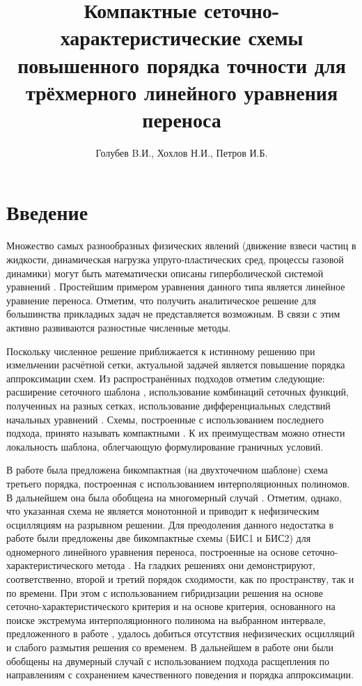 \documentclass[11pt]{article}
\title{Компактные сеточно-характеристические схемы повышенного порядка точности для трёхмерного линейного уравнения переноса}
\date{}
\author{Голубев B.И., Хохлов Н.И., Петров И.Б.}
\begin{document}
\maketitle

\section{Введение}

Множество самых разнообразных физических явлений (движение взвеси частиц в жидкости, динамическая нагрузка упруго-пластических сред, процессы газовой динамики) могут быть математически описаны гиперболической системой уравнений \cite{Kholodov2008}.
Простейшим примером уравнения данного типа является линейное уравнение переноса.
Отметим, что получить аналитическое решение для большинства прикладных задач не представляется возможным.
В связи с этим активно развиваются разностные численные методы.

Поскольку численное решение приближается к истинному решению при измельчении расчётной сетки, актуальной задачей является повышение порядка аппроксимации схем.
Из распространённых подходов отметим следующие: расширение сеточного шаблона \cite{Rusanov1961}, использование комбинаций сеточных функций, полученных на разных сетках,
использование дифференциальных следствий начальных уравнений \cite{Khol2006}.
Схемы, построенные с использованием последнего подхода, принято называть компактными \cite{Tolstih1990}.
К их преимуществам можно отнести локальность шаблона, облегчающую формулирование граничных условий.

В работе \cite{Yabe1991} была предложена бикомпактная (на двухточечном шаблоне) схема третьего порядка, построенная с использованием интерполяционных полиномов.
В дальнейшем она была обобщена на многомерный случай \cite{Yabe2004}.
Отметим, однако, что указанная схема не является монотонной и приводит к нефизическим осцилляциям на разрывном решении.
Для преодоления данного недостатка в работе \cite{Khokhlov1D2014} были предложены две бикомпактные схемы (БИС1 и БИС2) для одномерного
линейного уравнения переноса, построенные на основе сеточно-характеристического метода \cite{Magometov-Kholodov-1969}.
На гладких решениях они демонстрируют, соответственно, второй и третий порядок сходимости, как по пространству, так и по времени.
При этом с использованием гибридизации решения \cite{petrov1984} на основе сеточно-характеристического критерия \cite{van1979} и на основе критерия,
основанного на поиске экстремума интерполяционного полинома на выбранном интервале, предложенного в работе \cite{Khokhlov1D2014},
удалось добиться отсутствия нефизических осцилляций и слабого размытия решения со временем.
В дальнейшем в работе \cite{Golubev2D2014} они были обобщены на двумерный случай с использованием подхода расщепления по направлениям с сохранением качественного поведения и порядка аппроксимации.
\end{document}
